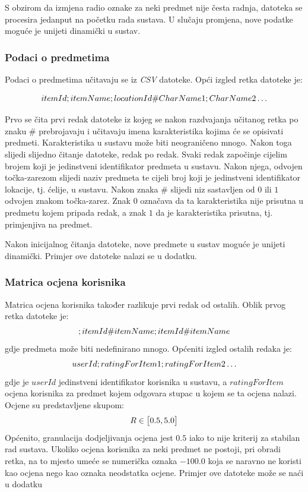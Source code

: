 \documentclass[times, utf8, diplomski, numeric]{fer}
\begin{document}
S obzirom da izmjena radio oznake za neki predmet nije česta radnja, datoteka se
procesira jedanput na početku rada sustava. U slučaju promjena, nove podatke
moguće je unijeti dinamički u sustav.

\subsubsection{Podaci o predmetima}
Podaci o predmetima učitavaju se iz \emph{CSV} datoteke. Opći izgled retka
datoteke je:

\begin{equation}
	\centering
	itemId;itemName;locationId\#CharName1;CharName2 \ldots
\end{equation}

Prvo se čita prvi redak datoteke iz kojeg se nakon razdvajanja učitanog retka po
znaku $\#$ prebrojavaju i učitavaju imena karakteristika kojima će se opisivati
predmeti. Karakteristika u sustavu može biti neograničeno mnogo. Nakon toga
slijedi slijedno čitanje datoteke, redak po redak. Svaki redak započinje
cijelim brojem koji je jedinstveni identifikator predmeta u sustavu. Nakon
njega, odvojen točka-zarezom slijedi naziv predmeta te cijeli broj koji je
jedinstveni identifikator lokacije, tj. ćelije, u sustavu. Nakon
znaka $\#$ slijedi niz sastavljen od $0$ ili $1$ odvojen znakom točka-zarez.
Znak $0$ označava da ta karakteristika nije prisutna u predmetu kojem pripada
redak, a znak $1$ da je karakteristika prisutna, tj. primjenjiva na predmet.

Nakon inicijalnog čitanja datoteke, nove predmete u sustav moguće je unijeti
dinamički. Primjer ove datoteke nalazi se u dodatku.

\subsubsection{Matrica ocjena korisnika}
Matrica ocjena korisnika također razlikuje prvi redak od ostalih. 
Oblik prvog retka datoteke je:
\begin{equation}
	\centering
	;itemId\#itemName;itemId\#itemName
\end{equation}
gdje predmeta može biti nedefinirano mnogo. Općeniti izgled ostalih redaka je:
\begin{equation}
	\centering
	userId;ratingForItem1;ratingForItem2 \ldots
\end{equation}
gdje je $userId$ jedinstveni identifikator korisnika u sustavu, a
$ratingForItem$ ocjena korisnika za predmet kojem odgovara stupac u kojem se ta
ocjena nalazi. Ocjene su predstavljene skupom:
\begin{equation}
	\centering
	R \in \big[ 0.5, 5.0 \big]
\end{equation}
Općenito, granulacija dodjeljivanja ocjena jest $0.5$ iako to nije kriterij za
stabilan rad sustava. Ukoliko ocjena korisnika za neki predmet ne postoji, pri
obradi retka, na to mjesto umeće se numerička oznaka $-100.0$ koja se naravno
ne koristi kao ocjena nego kao oznaka neodstatka ocjene. Primjer ove datoteke
može se naći u dodatku
\end{document}

